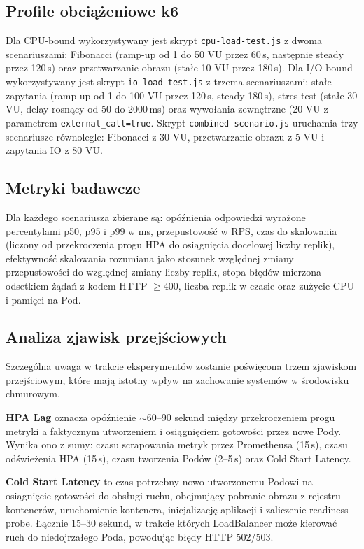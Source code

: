 \subsection{Profile obciążeniowe k6}

Dla CPU-bound wykorzystywany jest skrypt \texttt{cpu-load-test.js} z dwoma scenariuszami: Fibonacci (ramp-up od 1 do 50 VU przez 60\,s, następnie steady przez 120\,s) oraz przetwarzanie obrazu (stałe 10 VU przez 180\,s). Dla I/O-bound wykorzystywany jest skrypt \texttt{io-load-test.js} z trzema scenariuszami: stałe zapytania (ramp-up od 1 do 100 VU przez 120\,s, steady 180\,s), stres-test (stałe 30 VU, delay rosnący od 50 do 2000\,ms) oraz wywołania zewnętrzne (20 VU z parametrem \texttt{external\_call=true}. Skrypt \texttt{combined-scenario.js} uruchamia trzy scenariusze równolegle: Fibonacci z 30 VU, przetwarzanie obrazu z 5 VU i zapytania IO z 80 VU.

\subsection{Metryki badawcze}

Dla każdego scenariusza zbierane są: opóźnienia odpowiedzi wyrażone percentylami p50, p95 i p99 w ms, przepustowość w RPS, czas do skalowania (liczony od przekroczenia progu HPA do osiągnięcia docelowej liczby replik), efektywność skalowania rozumiana jako stosunek względnej zmiany przepustowości do względnej zmiany liczby replik, stopa błędów mierzona odsetkiem żądań z kodem HTTP $\geq 400$, liczba replik w czasie oraz zużycie CPU i pamięci na Pod.

\subsection{Analiza zjawisk przejściowych}

Szczególna uwaga w trakcie eksperymentów zostanie poświęcona trzem zjawiskom przejściowym, które mają istotny wpływ na zachowanie systemów w środowisku chmurowym.

\textbf{HPA Lag} oznacza opóźnienie $\sim$60--90 sekund między przekroczeniem progu metryki a faktycznym utworzeniem i osiągnięciem gotowości przez nowe Pody. Wynika ono z sumy: czasu scrapowania metryk przez Prometheusa (15\,s), czasu odświeżenia HPA (15\,s), czasu tworzenia Podów (2--5\,s) oraz Cold Start Latency.

\textbf{Cold Start Latency} to czas potrzebny nowo utworzonemu Podowi na osiągnięcie gotowości do obsługi ruchu, obejmujący pobranie obrazu z rejestru kontenerów, uruchomienie kontenera, inicjalizację aplikacji i zaliczenie readiness probe. Łącznie 15--30 sekund, w trakcie których LoadBalancer może kierować ruch do niedojrzałego Poda, powodując błędy HTTP 502/503.

